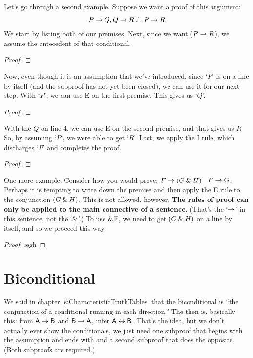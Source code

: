 Let's go through a second example. Suppose we want a proof of this argument:
	$$P \rightarrow Q, Q \rightarrow R \mathrel{\ldotp\dot{}\,\ldotp} P \rightarrow R$$
We start by listing both of our premises. Next, since we want ($P \rightarrow R$), we assume the antecedent of that conditional. 
\begin{proof}
	 
	 
	\open
		 
	\close
\end{proof}
Now, even though it is an assumption that we've introduced, since `$P$' is on a line by itself (and the subproof has not yet been closed), we can use it for our next step. With `$P$', we can use {\eif}E on the first premise. This gives us `$Q$'. 
\begin{proof}
	 
	 
	\open
	\close
\end{proof}
With the $Q$ on line 4, we can use {\eif}E on the second premise, and that gives us $R$ So, by assuming `$P$', we were able to get `$R$'. Last, we apply the {\eif}I rule, which discharges `$P$' and completes the proof.
\label{HSproof}
\begin{proof}
	 
	 
	\open
	\close
\end{proof}

One more example. Consider how you would prove: $F\rightarrow(G\mathbin{\&} H)$ \therefore\ $F\rightarrow G$. Perhaps it is tempting to write down the premise and then apply the {\eand}E rule to the conjunction $(G \mathbin{\&} H)$. This is not allowed, however. \textbf{The rules of proof can only be applied to the main connective of a sentence.} (That's the `$\rightarrow$' in this sentence, not the `$\mathbin{\&}$'.) To use $\mathbin{\&}$E, we need to get $(G \mathbin{\&} H)$ on a line by itself, and so we proceed this way:

\begin{proof}
	 
	\open
		\ae{gh}
	\close
\end{proof}


\section{Biconditional}
We said in chapter \ref{s:CharacteristicTruthTables} that the biconditional is ``the conjunction of a conditional running in each direction.'' The  then is, basically this: from $\mathsf{A} \rightarrow \mathsf{B}$ and $\mathsf{B} \rightarrow \mathsf{A}$, infer $\mathsf{A} \leftrightarrow \mathsf{B}$. That's the idea, but we don't actually ever show the conditionals, we just need one subproof that begins with the assumption  and ends with  and a second subproof that does the opposite. (Both subproofs are required.)

